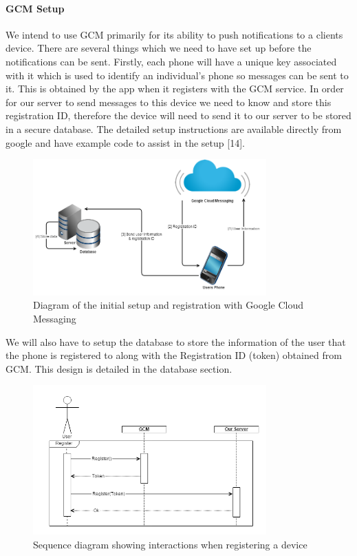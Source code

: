 \documentclass{article}
\begin{document}
		
		
		\paragraph{GCM Setup}
		We intend to use GCM primarily for its ability to push notifications to a clients device. There are several things which we need to have set up before the notifications can be sent. Firstly, each phone will have a unique key associated with it which is used to identify an individual's phone so messages can be sent to it. This is obtained by the app when it registers with the GCM service. In order for our server to send messages to this device we need to know and store this registration ID, therefore the device will need to send it to our server to be stored in a secure database. The detailed setup instructions are available directly from google and have example code to assist in the setup [14]. \\

	\begin{figure}[H]
		\centering
		\includegraphics[width=0.8\textwidth]{"Initial GCM Setup - Iteration 0"}
		\caption{Diagram of the initial setup and registration with Google Cloud Messaging}
	\end{figure}
	
	We will also have to setup the database to store the information of the user that the phone is registered to along with the Registration ID (token) obtained from GCM. This design is detailed in the database section.\\
	
	\begin{figure}[H]
		\centering
		\includegraphics[width=0.8\textwidth]{"GCM Registration Sequence Diagram - Iteration 0"}
		\caption{Sequence diagram showing interactions when registering a device}
	\end{figure}
\end{document}
